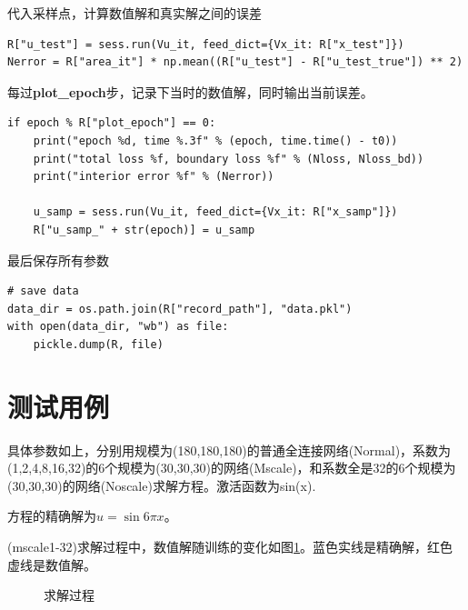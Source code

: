 \documentclass[12pt,a4paper]{article}
\begin{document}
代入采样点，计算数值解和真实解之间的误差
\begin{lstlisting}
R["u_test"] = sess.run(Vu_it, feed_dict={Vx_it: R["x_test"]})
Nerror = R["area_it"] * np.mean((R["u_test"] - R["u_test_true"]) ** 2)
\end{lstlisting}

每过\textbf{plot\_epoch}步，记录下当时的数值解，同时输出当前误差。
\begin{lstlisting}
if epoch % R["plot_epoch"] == 0:
    print("epoch %d, time %.3f" % (epoch, time.time() - t0))
    print("total loss %f, boundary loss %f" % (Nloss, Nloss_bd))
    print("interior error %f" % (Nerror))

    u_samp = sess.run(Vu_it, feed_dict={Vx_it: R["x_samp"]})
    R["u_samp_" + str(epoch)] = u_samp
\end{lstlisting}

最后保存所有参数
\begin{lstlisting}
# save data
data_dir = os.path.join(R["record_path"], "data.pkl")
with open(data_dir, "wb") as file:
    pickle.dump(R, file)
\end{lstlisting}

\section*{测试用例}

具体参数如上，分别用规模为(180,180,180)的普通全连接网络(Normal)，系数为(1,2,4,8,16,32)的6个规模为(30,30,30)的网络(Mscale)，和系数全是32的6个规模为(30,30,30)的网络(Noscale)求解方程。激活函数为sin(x).

方程的精确解为$u = \sin 6 \pi x$。

(mscale1-32)求解过程中，数值解随训练的变化如图\ref{proc}。蓝色实线是精确解，红色虚线是数值解。
\begin{figure}[h]
\centering
{}
\caption{求解过程}
\label{proc}
\end{figure}
\end{document}
